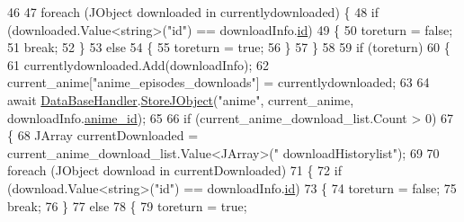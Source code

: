 \begin{DoxyCode}
46 
47                 \textcolor{keywordflow}{foreach} (JObject downloaded \textcolor{keywordflow}{in} currentlydownloaded) \{
48                     \textcolor{keywordflow}{if} (downloaded.Value<\textcolor{keywordtype}{string}>(\textcolor{stringliteral}{"id"}) == downloadInfo.\mbox{\hyperlink{class_little_weeb_library_1_1_models_1_1_json_downloaded_info_aeb59734113f03f4435a5a2d51c1d6f5c}{id}})
49                     \{
50                         toreturn = \textcolor{keyword}{false};
51                         \textcolor{keywordflow}{break};
52                     \}
53                     \textcolor{keywordflow}{else}
54                     \{
55                         toreturn = \textcolor{keyword}{true};
56                     \}
57                 \}
58 
59                 \textcolor{keywordflow}{if} (toreturn)
60                 \{
61                     currentlydownloaded.Add(downloadInfo);
62                     current\_anime[\textcolor{stringliteral}{"anime\_episodes\_downloads"}] = currentlydownloaded;
63 
64                     await \mbox{\hyperlink{class_little_weeb_library_1_1_handlers_1_1_file_history_handler_afe186c8ea770ecb9253a07f82f23c471}{DataBaseHandler}}.\mbox{\hyperlink{interface_little_weeb_library_1_1_handlers_1_1_i_data_base_handler_a5d87c42ef7dc7e5d86f7e6fada3454e9}{StoreJObject}}(\textcolor{stringliteral}{"anime"}, current\_anime, 
      downloadInfo.\mbox{\hyperlink{class_little_weeb_library_1_1_models_1_1_json_downloaded_info_a400a0cb7bf87a5c5a03c099ebd95fc07}{anime\_id}});
65 
66                     \textcolor{keywordflow}{if} (current\_anime\_download\_list.Count > 0)
67                     \{
68                         JArray currentDownloaded = current\_anime\_download\_list.Value<JArray>(\textcolor{stringliteral}{"
      downloadHistorylist"});
69 
70                         \textcolor{keywordflow}{foreach} (JObject download \textcolor{keywordflow}{in} currentDownloaded)
71                         \{
72                             \textcolor{keywordflow}{if} (download.Value<\textcolor{keywordtype}{string}>(\textcolor{stringliteral}{"id"}) == downloadInfo.\mbox{\hyperlink{class_little_weeb_library_1_1_models_1_1_json_downloaded_info_aeb59734113f03f4435a5a2d51c1d6f5c}{id}})
73                             \{
74                                 toreturn = \textcolor{keyword}{false};
75                                 \textcolor{keywordflow}{break};
76                             \}
77                             \textcolor{keywordflow}{else}
78                             \{
79                                 toreturn = \textcolor{keyword}{true};

\end{DoxyCode}
